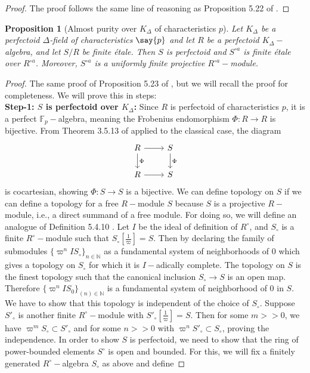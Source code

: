 \documentclass[12pts,a4paper]{amsart}
\newtheorem{proposition}{Proposition}[section]
\begin{document}
\begin{proof}
    The proof follows the same line of reasoning as Proposition 5.22 of \cite{Sch}.
\end{proof}

\begin{proposition}[Almost purity over $K_\Delta$ of characteristics $p$]
    Let $K_\Delta$ be a perfectoid $\Delta$-field of characteristics $\say{p}$ and let $R$ be a perfectoid $K_\Delta-$algebra, and let $S/R$ be finite \'{e}tale. Then $S$ is perfectoid and $S^{\circ a}$ is finite \'{e}tale over $R^{\circ a}$. Moreover, $S^{\circ a}$ is a uniformly finite projective $R^{\circ a}-$module.
\end{proposition}

\begin{proof}
    The same proof of Proposition 5.23 of \cite{Sch}, but we will recall the proof for completeness. We will prove this in steps:\\
    \textbf{Step-1: $S$ is perfectoid over $K_\Delta$:} Since $R$ is perfectoid of characteristics $p$, it is a perfect $\mathbb{F}_p-$algebra, meaning the Frobenius endomorphism $\Phi:R\to R$ is bijective. From Theorem 3.5.13 of \cite{ART} applied to the classical case, the diagram
    \[
    \begin{tikzcd}
        R\arrow[r]\arrow[d,"\Phi"] & S\arrow[d,"\Phi"]\\
        R\arrow[r]           & S
    \end{tikzcd}
    \]
    is cocartesian, showing $\Phi:S\to S$ is a bijective. We can define topology on $S$ if we can define a topology for a free $ R-$module $S$ because $S$ is a projective $R-$module, i.e., a direct summand of a free module. For doing so, we will define an analogue of Definition 5.4.10 \cite{ART}. Let $I$ be the ideal of definition of $R^\circ$, and $S_\circ$ is a finite $R^\circ-$module such that $S_\circ\left[\frac{1}{\varpi}\right]=S$. Then by declaring the family of submodules $\{\varpi^{n}IS_\circ\}_{n\in\mathbb{N}}$ as a fundamental system of neighborhoods of $0$ which gives a topology on $S_\circ$ for which it is $I-$adically complete. The topology on $S$ is the finest topology such that the canonical inclusion $S_\circ\to S$ is an open map. Therefore $\{\varpi^n IS_0\}_{(n)\in\mathbb{N}}$ is a fundamental system of neighborhood of $0$ in $S$. We have to show that this topology is independent of the choice of $S_\circ$. Suppose $S'_\circ$ is another finite $R^\circ-$module with $S'_\circ\left[\frac{1}{\varpi}\right]=S$. Then for some $m>>0$, we have $\varpi^mS_\circ\subset S'_\circ$ and for some $n>>0$ with $\varpi^n S'_\circ\subset S_\circ$, proving the independence. In order to show $S$ is perfectoid, we need to show that the ring of power-bounded elements $S^\circ$ is open and bounded. For this, we will fix a finitely generated $R^\circ-$algebra $S_\circ$ as above and define

\end{proof}
\end{document}
